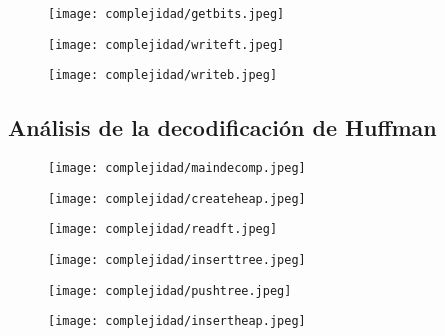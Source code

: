 \documentclass[12 pt]{report}
\begin{document}
\newpage
\begin{figure}[h!]
  \texttt{[image: complejidad/getbits.jpeg]}
  \caption{\label{fig:Obtener la codificación correspondiente} }
\end{figure}
\begin{figure}[h!]
  \texttt{[image: complejidad/writeft.jpeg]}
  \caption{\label{fig:Escribir la tabla de frecuencias} }
\end{figure}
\newpage
\begin{figure}[h!]
  \texttt{[image: complejidad/writeb.jpeg]}
  \caption{\label{fig:Escribir el archivo compreso} }
\end{figure}
\newpage
\subsection{Análisis de la decodificación de Huffman}
\begin{figure}[h!]
  \centering
  \texttt{[image: complejidad/maindecomp.jpeg]}
  \caption{\label{fig:Main de la decodificación} }
\end{figure}
\newpage

\begin{figure}[h!]
  \centering
  \texttt{[image: complejidad/createheap.jpeg]}
  \caption{\label{fig:Reservar el espacio del montículo} }
\end{figure}

\begin{figure}[h!]
  \centering
  \texttt{[image: complejidad/readft.jpeg]}
  \caption{\label{fig:Leer la tabla de frecuencias}}
\end{figure}
\newpage
\begin{figure}[h!]
  \centering
  \texttt{[image: complejidad/inserttree.jpeg]}
  \caption{\label{fig:Insertar nodos en la cola de prioridad} }
\end{figure}

\begin{figure}[h!]
  \centering
  \texttt{[image: complejidad/pushtree.jpeg]}
  \caption{\label{fig:Insertar datos en los nodos} }
\end{figure}

\begin{figure}[h!]
  \centering
  \texttt{[image: complejidad/insertheap.jpeg]}
  \caption{\label{fig:Insercion en la cola de prioridad} }
\end{figure}
\newpage
\end{document}
